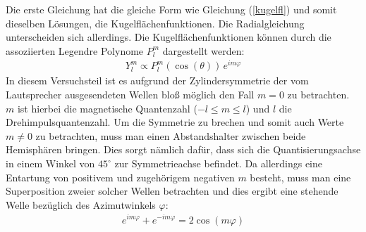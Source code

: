 \documentclass[german,  %
parskip=full,  %
]{scrartcl}
\begin{document}
Die erste Gleichung hat die gleiche Form wie Gleichung (\ref{kugelfl}) und somit dieselben Lösungen, die Kugelflächenfunktionen. Die Radialgleichung unterscheiden sich allerdings. Die Kugelflächenfunktionen können durch die assoziierten Legendre Polynome $P^{m}_{l}$ dargestellt werden:
\begin{align}
 Y^{m}_{l} 	\propto P^{m}_{l}(\cos(\theta))\, e^{im\varphi}
\end{align}
In diesem Versuchsteil ist es aufgrund der Zylindersymmetrie der vom Lautsprecher ausgesendeten Wellen bloß möglich den Fall $m = 0$ zu betrachten. $m$ ist hierbei die magnetische Quantenzahl ($-l \leq m \leq l$) und $l$ die Drehimpulsquantenzahl.
\newline
\newline Um die Symmetrie zu brechen und somit auch Werte $m \neq 0$ zu betrachten, muss man einen Abstandshalter zwischen beide Hemisphären bringen. Dies sorgt nämlich dafür, dass sich die Quantisierungsachse in einem Winkel von $45^{\circ}$ zur Symmetrieachse befindet. Da allerdings eine Entartung von positivem und zugehörigem negativen $m$ besteht, muss man eine Superposition zweier solcher Wellen betrachten und dies ergibt eine stehende Welle bezüglich des Azimutwinkels $\varphi$:
\begin{align}
e^{im\varphi} + e^{-im\varphi} = 2\cos(m\varphi)
\end{align}
\end{document}

